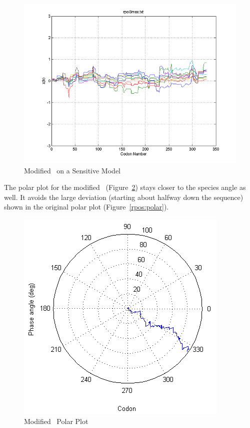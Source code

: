 \documentclass[10pt,twocolumn,draft]{article}
\begin{document}
\begin{figure}[htp]
    \centering
    \caption{Modified \rpoS\ on a Sensitive Model}
    \label{rposmax:sensdisp}
    \includegraphics[scale=0.7]{rpoS/max-sensitive.png}
\end{figure}

The polar plot for the modified \rpoS\ (Figure~\ref{rposmax:polar}) stays closer to the species angle as well.  
It avoids the large deviation (starting about halfway down the sequence) shown in the original polar plot (Figure~\ref{rpos:polar}).

\begin{figure}[htp]
    \centering
    \caption{Modified \rpoS\ Polar Plot}
    \label{rposmax:polar}
    \includegraphics[scale=0.7]{rpoS/max-polar.png}
\end{figure}
\end{document}
